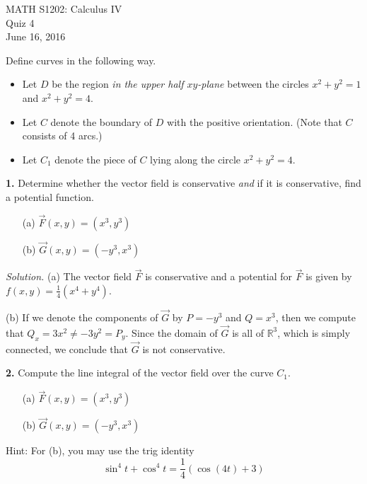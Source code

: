 \documentclass{article}
\begin{document}
\begin{center}
MATH S1202: Calculus IV \\ 
Quiz 4 \\
June 16, 2016
\end{center}

\noindent Define curves in the following way. 
\begin{itemize}
\item Let $D$ be the region \emph{in the upper half $xy$-plane} between the circles $x^2 + y^2 = 1$ and $x^2 + y^2 = 4$. 
\item Let $C$ denote the boundary of $D$ with the positive orientation. (Note that $C$ consists of 4 arcs.)
\item Let $C_1$ denote the piece of $C$ lying along the circle $x^2 + y^2 = 4$. 
\end{itemize}



\noindent \textbf{1.} Determine whether the vector field is conservative \emph{and} if it is conservative, find a potential function. 
\begin{enumerate}
\item[(a)] $\vec{F}(x,y) = (x^3, y^3)$
\item[(b)] $\vec{G}(x,y) = (-y^3, x^3)$
\end{enumerate}

\medskip

{\color{blue}
\noindent \emph{Solution.} (a) The vector field $\vec{F}$ is conservative and a potential for $\vec{F}$ is given by $f(x,y) = \frac{1}{4}(x^4 + y^4)$. 

(b) If we denote the components of $\vec{G}$ by $P = -y^3$ and $Q = x^3$, then we compute that $Q_x = 3x^2 \ne -3y^2 = P_y$. Since the domain of $\vec{G}$ is all of $\mathbb{R}^3$, which is simply connected, we conclude that $\vec{G}$ is not conservative. 
}

\vspace{3mm}

\noindent \textbf{2.} Compute the line integral of the vector field over the curve $C_1$. 
\begin{enumerate}
\item[(a)] $\vec{F}(x,y) = (x^3, y^3)$
\item[(b)] $\vec{G}(x,y) = (-y^3, x^3)$
\end{enumerate}
Hint: For (b), you may use the trig identity 
\[
\sin^4 t + \cos^4t = \frac{1}{4}\left(\cos(4t) + 3\right)
\]
\end{document}
